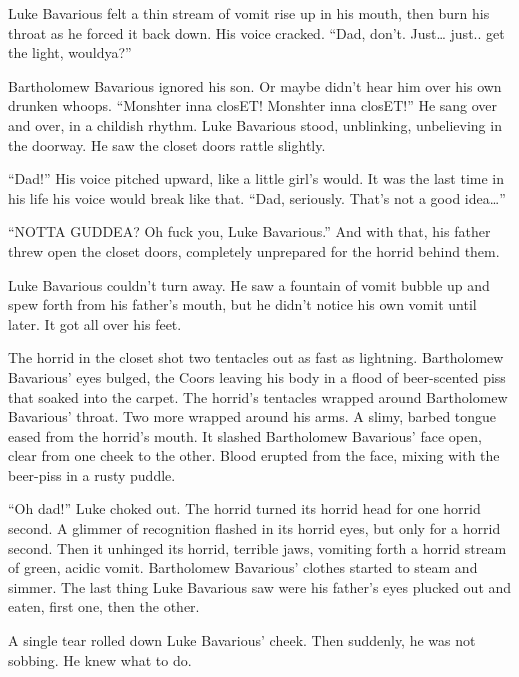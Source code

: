 Luke Bavarious felt a thin stream of vomit rise up in his mouth,
then burn his throat as he forced it back down. His voice cracked.
``Dad, don't. Just{\ldots} just.. get the light,
wouldya?''



Bartholomew Bavarious ignored his son. Or maybe didn't hear
him over his own drunken whoops. ``Monshter inna closET!
Monshter inna closET!'' He sang over and over, in a childish
rhythm. Luke Bavarious stood, unblinking, unbelieving in the
doorway. He saw the closet doors rattle slightly.



``Dad!'' His voice pitched upward, like a little
girl's would. It was the last time in his life his voice
would break like that. ``Dad, seriously. That's not a
good idea{\ldots}''



``NOTTA GUDDEA? Oh fuck you, Luke Bavarious.'' And with
that, his father threw open the closet doors, completely unprepared
for the horrid behind them.



Luke Bavarious couldn't turn away. He saw a fountain of vomit
bubble up and spew forth from his father's mouth, but he
didn't notice his own vomit until later. It got all over his
feet.



The horrid in the closet shot two tentacles out as fast as
lightning. Bartholomew Bavarious' eyes bulged, the Coors
leaving his body in a flood of beer-scented piss that soaked into
the carpet. The horrid's tentacles wrapped around Bartholomew
Bavarious' throat. Two more wrapped around his arms. A slimy,
barbed tongue eased from the horrid's mouth. It slashed
Bartholomew Bavarious' face open, clear from one cheek to the
other. Blood erupted from the face, mixing with the beer-piss in a
rusty puddle.



``Oh dad!'' Luke choked out. The horrid turned its horrid
head for one horrid second. A glimmer of recognition flashed in its
horrid eyes, but only for a horrid second. Then it unhinged its
horrid, terrible jaws, vomiting forth a horrid stream of green,
acidic vomit. Bartholomew Bavarious' clothes started to steam
and simmer. The last thing Luke Bavarious saw were his
father's eyes plucked out and eaten, first one, then the
other.



A single tear rolled down Luke Bavarious' cheek. Then
suddenly, he was not sobbing. He knew what to do.



